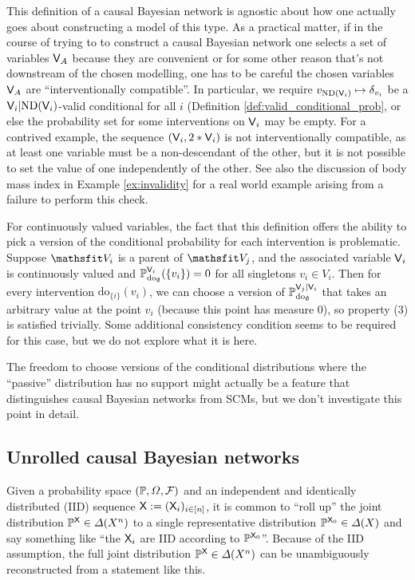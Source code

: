 This definition of a causal Bayesian network is agnostic about how one actually goes about constructing a model of this type. As a practical matter, if in the course of trying to to construct a causal Bayesian network one selects a set of variables $\mathsf{V}_A$ because they are convenient or for some other reason that's not downstream of the chosen modelling, one has to be careful the chosen variables $\mathsf{V}_A$ are ``interventionally compatible''. In particular, we require $v_{\mathrm{ND}(\mathsf{V}_i)}\mapsto \delta_{v_i}$ be a $\mathsf{V}_i|\mathrm{ND}(\mathsf{V}_i)$-valid conditional for all $i$ (Definition \ref{def:valid_conditional_prob}, or else the probability set for some interventions on $\mathsf{V}_i$ may be empty. For a contrived example, the sequence $(\mathsf{V}_i, 2*\mathsf{V}_i)$ is not interventionally compatible, as at least one variable must be a non-descendant of the other, but it is not possible to set the value of one independently of the other. See also the discussion of body mass index in Example \ref{ex:invalidity} for a real world example arising from a failure to perform this check.

For continuously valued variables, the fact that this definition offers the ability to pick a version of the conditional probability for each intervention is problematic. Suppose $\node{V}_i$ is a parent of $\node{V}_j$, and the associated variable $\mathsf{V}_i$ is continuously valued and $\mathbb{P}_{\mathrm{do}_{\emptyset}}^{\mathsf{V}_i}(\{v_i\})=0$ for all singletons $v_i\in V_i$. Then for every intervention $\mathrm{do}_{\{i\}}(v_i)$, we can choose a version of $\mathbb{P}_{\mathrm{do}_{\emptyset}}^{\mathsf{V}_j|\mathsf{V}_i}$ that takes an arbitrary value at the point $v_i$ (because this point has measure 0), so property (3) is satisfied trivially. Some additional consistency condition seems to be required for this case, but we do not explore what it is here.

The freedom to choose versions of the conditional distributions where the ``passive'' distribution has no support might actually be a feature that distinguishes causal Bayesian networks from SCMs, but we don't investigate this point in detail.

\subsection{Unrolled causal Bayesian networks}\label{sec:unrolling}

Given a probability space $(\mathbb{P},\Omega,\mathcal{F})$ and an independent and identically distributed (IID) sequence $\mathsf{X}:=(\mathsf{X}_i)_{i\in [n]}$, it is common to ``roll up'' the joint distribution $\mathbb{P}^{\mathsf{X}}\in\Delta(X^n)$ to a single representative distribution $\mathbb{P}^{\mathsf{X}_0}\in \Delta(X)$ and say something like ``the $\mathsf{X}_i$ are IID according to $\mathbb{P}^{\mathsf{X}_0}$''. Because of the IID assumption, the full joint distribution $\mathbb{P}^{\mathsf{X}}\in\Delta(X^n)$ can be unambiguously reconstructed from a statement like this.


